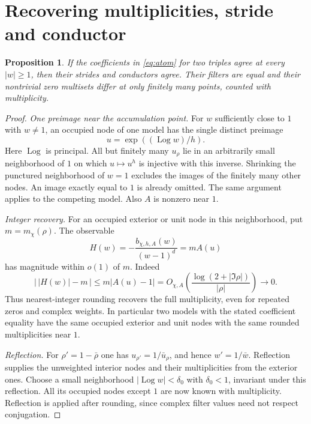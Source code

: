 \documentclass[11pt]{article}
\newtheorem{proposition}[theorem]{Proposition}
\DeclareMathOperator{\Log}{Log}
\begin{document}
\section{Recovering multiplicities, stride and conductor}\label{sec:decode}
\begin{proposition}\label{prop:decode}
If the coefficients in \eqref{eq:atom} for two triples agree at every $|w|\ge1$, then their strides and conductors agree. Their filters are equal and their nontrivial zero multisets differ at only finitely many points, counted with multiplicity.
\end{proposition}
\begin{proof}
\emph{One preimage near the accumulation point.}
For $w$ sufficiently close to $1$ with $w\ne1$, an occupied node of one model has the single distinct preimage
\[
 u=\exp((\Log w)/h).
\]
Here $\Log$ is principal. All but finitely many $u_\rho$ lie in an arbitrarily small neighborhood of $1$ on which $u\mapsto u^h$ is injective with this inverse. Shrinking the punctured neighborhood of $w=1$ excludes the images of the finitely many other nodes. An image exactly equal to $1$ is already omitted. The same argument applies to the competing model. Also $A$ is nonzero near $1$.

\emph{Integer recovery.}
For an occupied exterior or unit node in this neighborhood, put $m=m_\chi(\rho)$. The observable
\[
 H(w)=-\frac{b_{\chi,h,A}(w)}{(w-1)^d}=m A(u)
\]
has magnitude within $o(1)$ of $m$. Indeed
\[
 \big|\,|H(w)|-m\,\big|\le m|A(u)-1|
 =O_{\chi,A}\!\left(\frac{\log(2+|\Im\rho|)}{|\rho|}\right)\longrightarrow0 .
\]
Thus nearest-integer rounding recovers the full multiplicity, even for repeated zeros and complex weights. In particular two models with the stated coefficient equality have the same occupied exterior and unit nodes with the same rounded multiplicities near $1$.

\emph{Reflection.}
For $\rho'=1-\bar\rho$ one has $u_{\rho'}=1/\bar u_\rho$, and hence $w'=1/\bar w$. Reflection supplies the unweighted interior nodes and their multiplicities from the exterior ones. Choose a small neighborhood $|\Log w|<\delta_0$ with $\delta_0<1$, invariant under this reflection. All its occupied nodes except $1$ are now known with multiplicity. Reflection is applied after rounding, since complex filter values need not respect conjugation.


\end{proof}
\end{document}

